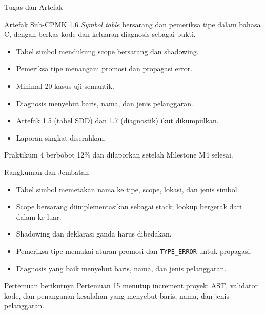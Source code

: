 \documentclass[aspectratio=169,10pt,t]{beamer}
\begin{document}
\begin{frame}{Tugas dan Artefak}
  \begin{block}{Artefak Sub-CPMK 1.6}
    \textit{Symbol table} bersarang dan pemeriksa tipe dalam bahasa C,
    dengan berkas kode dan keluaran diagnosis sebagai bukti.
  \end{block}

  \small
  \begin{itemize}
    \item Tabel simbol mendukung scope bersarang dan shadowing.
    \item Pemeriksa tipe menangani promosi dan propagasi error.
    \item Minimal 20 kasus uji semantik.
    \item Diagnosis menyebut baris, nama, dan jenis pelanggaran.
    \item Artefak 1.5 (tabel SDD) dan 1.7 (diagnostik) ikut
          dikumpulkan.
    \item Laporan singkat diserahkan.
  \end{itemize}

  \vspace{3pt}
  {\footnotesize\color{ubbblue!75}Praktikum 4 berbobot 12\% dan
  dilaporkan setelah Milestone M4 selesai.}
\end{frame}

\begin{frame}{Rangkuman dan Jembatan}
  \begin{itemize}
    \item Tabel simbol memetakan nama ke tipe, scope, lokasi, dan
          jenis simbol.
    \item Scope bersarang diimplementasikan sebagai stack; lookup
          bergerak dari dalam ke luar.
    \item Shadowing dan deklarasi ganda harus dibedakan.
    \item Pemeriksa tipe memakai aturan promosi dan
          \texttt{TYPE\_ERROR} untuk propagasi.
    \item Diagnosis yang baik menyebut baris, nama, dan jenis
          pelanggaran.
  \end{itemize}

  \vspace{4pt}
  \begin{exampleblock}{Pertemuan berikutnya}
    Pertemuan 15 menutup increment proyek: AST, validator kode, dan
    penanganan kesalahan yang menyebut baris, nama, dan jenis
    pelanggaran.
  \end{exampleblock}
\end{frame}
\end{document}
